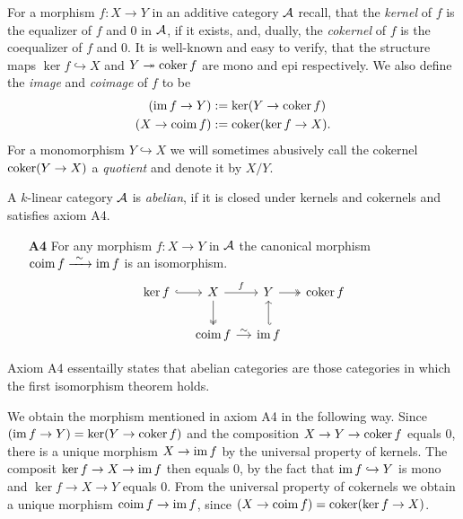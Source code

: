 For a morphism $f\colon X \to Y$ in an additive category $\mathcal A$ recall, that the \emph{kernel} of $f$ is the equalizer of $f$ and $0$ in $\mathcal A$, if it exists, and, dually, the \emph{cokernel} of $f$ is the coequalizer of $f$ and $0$. It is well-known and easy to verify, that the structure maps $\ker f \hookrightarrow X$ and $Y \twoheadrightarrow \operatorname{coker} f$ are mono and epi respectively. We also define the \emph{image} and \emph{coimage} of $f$ to be
\begin{align*}
    (\operatorname{im} f \to Y) &:= \ker(Y \to \operatorname{coker} f) \\
    (X \to \operatorname{coim} f) &:= \operatorname{coker}(\ker f \to X).
\end{align*}
For a monomorphism $Y \hookrightarrow X$ we will sometimes abusively call the cokernel $\operatorname{coker}(Y \to X)$ a \emph{quotient} and denote it by $X/Y$.

\begin{definition}
    A $k$-linear category $\mathcal A$ is \emph{abelian}, if it is closed under kernels and cokernels and satisfies axiom A4.
    \begin{enumerate}
        \item[\textbf{A4}] For any morphism $f\colon X \to Y$ in $\mathcal A$ the canonical morphism $\operatorname{coim} f \xrightarrow{\ \sim \ } \operatorname{im} f$ is an isomorphism.
        \[\begin{tikzcd}[column sep = small]
            {\ker f} & X & Y & {\coker f} \\
            & \coim f & \im f
            \arrow[hook, from=1-1, to=1-2]
            \arrow["f", from=1-2, to=1-3]
            \arrow[two heads, from=1-2, to=2-2]
            \arrow[two heads, from=1-3, to=1-4]
            \arrow[hook', from=2-3, to=1-3]
            \arrow["\sim", from=2-2, to=2-3]
        \end{tikzcd}\] 
    \end{enumerate}
\end{definition}

Axiom A4 essentailly states that abelian categories are those categories in which the first isomorphism theorem holds.

\begin{remark}
    We obtain the morphism mentioned in axiom A4 in the following way. Since $(\operatorname{im} f \to Y) = \ker(Y \to \operatorname{coker} f)$ and the composition $X \to Y \to \operatorname{coker} f$ equals $0$, there is a unique morphism $X \to \operatorname{im} f$ by the universal property of kernels. The composit $\ker f \to X \to \operatorname{im} f$ then equals $0$, by the fact that $\operatorname{im} f \hookrightarrow Y$ is mono and $\ker f \to X \to Y$ equals $0$. From the universal property of cokernels we obtain a unique morphism $\operatorname{coim} f \to \operatorname{im} f$, since $(X \to \operatorname{coim} f) = \operatorname{coker}(\ker f \to X)$.
\end{remark}


